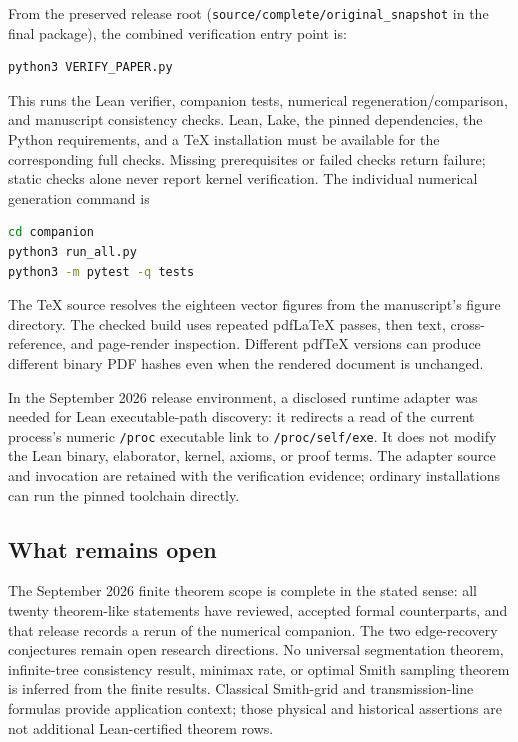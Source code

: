 \documentclass[11pt,letterpaper]{article}
\theoremstyle{plain}
\theoremstyle{plain}
\theoremstyle{plain}
\theoremstyle{definition}
\theoremstyle{definition}
\theoremstyle{definition}
\theoremstyle{definition}
\theoremstyle{remark}
\theoremstyle{remark}
\theoremstyle{remark}
\theoremstyle{remark}
\begin{document}
From the preserved release root (\texttt{source/complete/original\_snapshot} in the final package), the combined verification entry point is:
\begin{lstlisting}[language=bash,numbers=none]
python3 VERIFY_PAPER.py
\end{lstlisting}
This runs the Lean verifier, companion tests, numerical regeneration/comparison, and manuscript consistency checks. Lean, Lake, the pinned dependencies, the Python requirements, and a TeX installation must be available for the corresponding full checks. Missing prerequisites or failed checks return failure; static checks alone never report kernel verification. The individual numerical generation command is
\begin{lstlisting}[language=bash,numbers=none]
cd companion
python3 run_all.py
python3 -m pytest -q tests
\end{lstlisting}
The TeX source resolves the eighteen vector figures from the manuscript's figure directory. The checked build uses repeated pdfLaTeX passes, then text, cross-reference, and page-render inspection. Different pdfTeX versions can produce different binary PDF hashes even when the rendered document is unchanged.

In the September 2026 release environment, a disclosed runtime adapter was needed for Lean executable-path discovery: it redirects a read of the current process's numeric \texttt{/proc} executable link to \texttt{/proc/self/exe}. It does not modify the Lean binary, elaborator, kernel, axioms, or proof terms. The adapter source and invocation are retained with the verification evidence; ordinary installations can run the pinned toolchain directly.

\subsection{What remains open}

The September 2026 finite theorem scope is complete in the stated sense: all twenty theorem-like statements have reviewed, accepted formal counterparts, and that release records a rerun of the numerical companion. The two edge-recovery conjectures remain open research directions. No universal segmentation theorem, infinite-tree consistency result, minimax rate, or optimal Smith sampling theorem is inferred from the finite results. Classical Smith-grid and transmission-line formulas provide application context; those physical and historical assertions are not additional Lean-certified theorem rows.
\end{document}
